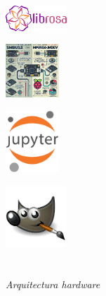 \documentclass{beamer}
\begin{document}
\begin{frame}
\begin{minipage}{0.3\textwidth}
    \centering
    \includegraphics[width=2.3cm]{figs/librosa.png} 
\end{minipage}
\hfill
\begin{minipage}{0.3\textwidth}
    \centering
    \includegraphics[width=2.0cm]{figs/mag.jpg} 
\end{minipage}
\hfill
\begin{minipage}{0.3\textwidth}
    \centering
    \includegraphics[width=2.0cm]{figs/Jupyter.png}
\end{minipage}
\begin{minipage}{0.3\textwidth}
    \centering
    \includegraphics[width=2.3cm]{figs/gimp.jpeg} 
\end{minipage}
\end{frame}

\section*{}
\begin{frame}{}
  \centering \Huge
  \emph{Arquitectura hardware}
\end{frame}
\end{document}
